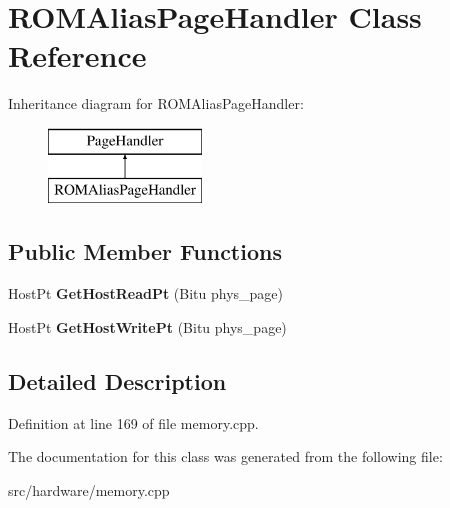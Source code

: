 \hypertarget{classROMAliasPageHandler}{\section{R\-O\-M\-Alias\-Page\-Handler Class Reference}
\label{classROMAliasPageHandler}
}
Inheritance diagram for R\-O\-M\-Alias\-Page\-Handler\-:\begin{figure}[H]
\begin{center}
\leavevmode
\includegraphics[height=2.000000cm]{classROMAliasPageHandler}
\end{center}
\end{figure}
\subsection*{Public Member Functions}
\begin{DoxyCompactItemize}
\item 
\hypertarget{classROMAliasPageHandler_ac9bc56f51008279f62a74204500ec4b3}{Host\-Pt {\bfseries Get\-Host\-Read\-Pt} (Bitu phys\-\_\-page)}\label{classROMAliasPageHandler_ac9bc56f51008279f62a74204500ec4b3}

\item 
\hypertarget{classROMAliasPageHandler_a305a02dd4698bb465b46e96268f2b375}{Host\-Pt {\bfseries Get\-Host\-Write\-Pt} (Bitu phys\-\_\-page)}\label{classROMAliasPageHandler_a305a02dd4698bb465b46e96268f2b375}

\end{DoxyCompactItemize}


\subsection{Detailed Description}


Definition at line 169 of file memory.\-cpp.



The documentation for this class was generated from the following file\-:\begin{DoxyCompactItemize}
\item 
src/hardware/memory.\-cpp\end{DoxyCompactItemize}
